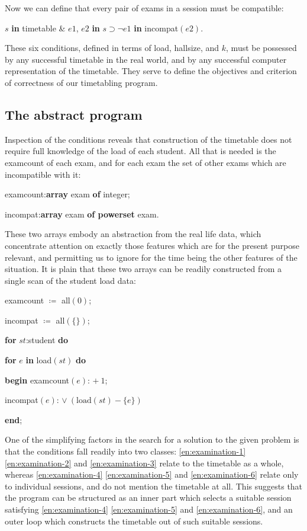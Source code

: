 \noindent
Now we can define that every pair of exams in a session must be compatible:

\quad $s$ \textbf{in} timetable \& $e1$, $e2$ \textbf{in} $s \supset\neg e1$ \textbf{in} incompat$(e2)$.

These six conditions, defined in terms of load, hallsize, and $k$, must be possessed by any successful timetable in the real world, and by any successful computer representation of the timetable. They serve to define the objectives and criterion of correctness of our timetabling program.

\subsection{The abstract program}

Inspection of the conditions reveals that construction of the timetable does not require full knowledge of the load of each student. All that is needed is the examcount of each exam, and for each exam the set of other exams which are incompatible with it:

\quad examcount:\textbf{array} exam \textbf{of} integer;

\quad incompat:\textbf{array} exam \textbf{of powerset} exam.

\noindent
These two arrays embody an abstraction from the real life data, which concentrate attention on exactly those features which are for the present purpose relevant, and permitting us to ignore for the time being the other features of the situation. It is plain that these two arrays can be readily constructed from a single scan of the student load data:

\quad examcount $\coloneq$ all$(0)$;

\quad incompat $\coloneq$ all$(\{\})$;

\quad \textbf{for} $st$:student \textbf{do}

\quad \quad \textbf{for} $e$ \textbf{in} load$(st)$ \textbf{do}

\quad \quad \quad \textbf{begin} examcount$(e)$: $+\ 1$;

\quad \quad \quad \quad incompat$(e)$: $\vee\ (\text{load}(st) - \{e\})$

\quad \quad \quad \textbf{end};

One of the simplifying factors in the search for a solution to the given problem is that the conditions fall readily into two classes: \ref{en:examination-1} \ref{en:examination-2} and \ref{en:examination-3} relate to the timetable as a whole, whereas \ref{en:examination-4} \ref{en:examination-5} and \ref{en:examination-6} relate only to individual sessions, and do not mention the timetable at all. This suggests that the program can be structured as an inner part which selects a suitable session satisfying \ref{en:examination-4} \ref{en:examination-5} and \ref{en:examination-6}, and an outer loop which constructs the timetable out of such suitable sessions.

